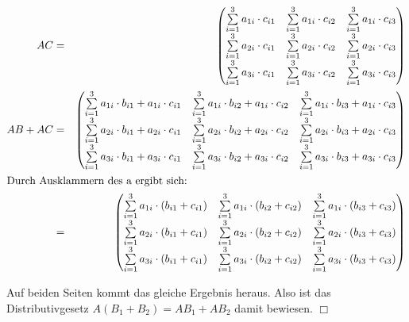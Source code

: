 \documentclass[10pt,a4paper,oneside,ngerman,numbers=noenddot]{scrartcl}
\begin{document}
\begin{alignat*}{2}
AC &=& \begin{pmatrix} \sum\limits_{i=1}^{3} a_{1i} \cdot c_{i1} & \sum\limits_{i=1}^{3} a_{1i} \cdot c_{i2} & \sum\limits_{i=1}^{3} a_{1i} \cdot c_{i3} \\ \sum\limits_{i=1}^{3} a_{2i} \cdot c_{i1} & \sum\limits_{i=1}^{3} a_{2i} \cdot c_{i2} & \sum\limits_{i=1}^{3} a_{2i} \cdot c_{i3} \\ \sum\limits_{i=1}^{3} a_{3i} \cdot c_{i1} & \sum\limits_{i=1}^{3} a_{3i} \cdot c_{i2} & \sum\limits_{i=1}^{3} a_{3i} \cdot c_{i3} \end{pmatrix} \\
AB + AC &=& \begin{pmatrix} \sum\limits_{i=1}^{3} a_{1i} \cdot b_{i1} + a_{1i} \cdot c_{i1} & \sum\limits_{i=1}^{3} a_{1i} \cdot b_{i2} + a_{1i} \cdot c_{i2} & \sum\limits_{i=1}^{3} a_{1i} \cdot b_{i3} + a_{1i} \cdot c_{i3} \\ \sum\limits_{i=1}^{3} a_{2i} \cdot b_{i1} + a_{2i} \cdot c_{i1} & \sum\limits_{i=1}^{3} a_{2i} \cdot b_{i2} + a_{2i} \cdot c_{i2} & \sum\limits_{i=1}^{3} a_{2i} \cdot b_{i3} + a_{2i} \cdot c_{i3} \\ \sum\limits_{i=1}^{3} a_{3i} \cdot b_{i1} + a_{3i} \cdot c_{i1} & \sum\limits_{i=1}^{3} a_{3i} \cdot b_{i2} + a_{3i} \cdot c_{i2} & \sum\limits_{i=1}^{3} a_{3i} \cdot b_{i3} + a_{3i} \cdot c_{i3} \end{pmatrix} \\
\intertext{Durch Ausklammern des a ergibt sich:}
&=& \begin{pmatrix} \sum\limits_{i=1}^{3} a_{1i} \cdot (b_{i1} + c_{i1}) & \sum\limits_{i=1}^{3} a_{1i} \cdot (b_{i2} + c_{i2}) & \sum\limits_{i=1}^{3} a_{1i} \cdot (b_{i3} + c_{i3})  \\ \sum\limits_{i=1}^{3} a_{2i} \cdot (b_{i1} + c_{i1}) & \sum\limits_{i=1}^{3} a_{2i} \cdot (b_{i2} + c_{i2}) & \sum\limits_{i=1}^{3} a_{2i} \cdot (b_{i3} + c_{i3}) \\ \sum\limits_{i=1}^{3} a_{3i} \cdot (b_{i1} + c_{i1}) & \sum\limits_{i=1}^{3} a_{3i} \cdot (b_{i2} + c_{i2}) & \sum\limits_{i=1}^{3} a_{3i} \cdot (b_{i3} + c_{i3}) \end{pmatrix}
\end{alignat*}

Auf beiden Seiten kommt das gleiche Ergebnis heraus. Also ist das Distributivgesetz $A(B_{1} + B_{2}) = AB_{1} + AB_{2}$ damit bewiesen. \hfill $\Box$
\section{} %
\end{document}
